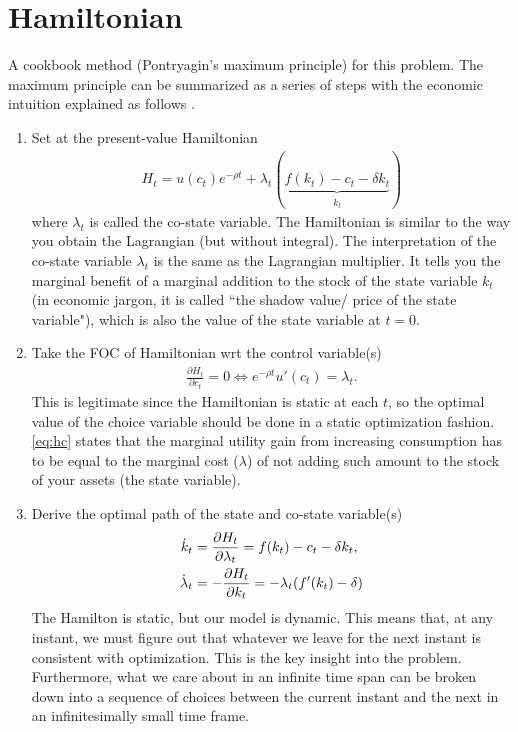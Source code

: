 \documentclass[11pt,a4paper]{book}
\newcommand{\red}[1]{\textcolor{red}{#1}}
\theoremstyle{definition}\newtheorem{definition}{Definition}
\theoremstyle{definition}\newtheorem{fact}{Fact}
\theoremstyle{definition}\newtheorem{remark}{Remark}
\theoremstyle{definition}\newtheorem{ex}{Ex.}
\theoremstyle{definition}\newtheorem{project}{Project}
\theoremstyle{definition}\newtheorem{problem}{Problem}
\theoremstyle{definition}\newtheorem{example}{Example}
\numberwithin{theorem}{section}
\numberwithin{corollary}{chapter}
\numberwithin{assumption}{chapter}
\numberwithin{definition}{chapter}
\numberwithin{prop}{chapter}
\numberwithin{notation}{chapter}
\numberwithin{problem}{chapter}
\numberwithin{example}{chapter}
\numberwithin{fact}{chapter}
\numberwithin{ex}{chapter}
\begin{document}
	\section{Hamiltonian}
	A cookbook method (Pontryagin’s maximum principle) for this problem.
		The maximum principle can be summarized as a series of steps with the economic intuition explained as follows \citep{campante2021advanced}.
	\begin{enumerate}
		\item Set at the present-value Hamiltonian
		\begin{align}
			H_t = u(c_t)e^{-\rho t} + \lambda_t ( \underbrace{f(k_t) - c_t - \delta k_t}_{\dot{k}_t})
		\end{align}
		where $\lambda_t$ is called the co-state variable. The Hamiltonian is similar to the way you obtain the Lagrangian (but without integral). The interpretation of the co-state variable $\lambda_t$ is the same as the Lagrangian multiplier. It tells you the marginal benefit of a marginal addition to the stock of the state variable $k_t$ (in economic jargon, it is called ``the shadow value/ price of the state variable"), which is also the value of the state variable at $t=0$.
				
		\item Take the FOC of Hamiltonian wrt the control variable(s)
		\begin{align}
			\frac{\partial H_t}{\partial c_t} = 0 \Leftrightarrow e^{-\rho t} u'(c_t) = \lambda_t. \label{eq:hc}
		\end{align}
		This is legitimate since the Hamiltonian is static at each $t$, so the optimal value of the choice variable should be done in a static optimization fashion. \eqref{eq:hc} states that the marginal utility gain from increasing consumption has to be equal to the marginal cost ($\lambda$) of not adding such amount to the stock of your assets (the state variable).
		
		\item Derive the optimal path of the state and co-state variable(s)
		\begin{align}
			\dot{k}_t &= \frac{\partial H_t}{\partial \lambda_t} = f(k_t) - c_t - \delta k_t, \label{eq:kdot} \\
			\dot{\lambda}_t &= \red{-} \frac{\partial H_t}{\partial k_t} = - \lambda_t (f'(k_t) - \delta) \label{eq:costate}
		\end{align}
		The Hamilton is static, but our model is dynamic. This means that, at any instant, we must figure out that whatever we leave for the next instant is consistent with optimization. This is the key insight into the problem. Furthermore, what we care about in an infinite time span can be broken down into a sequence of choices between the current instant and the next in an infinitesimally small time frame.
		

\end{enumerate}
\end{document}
